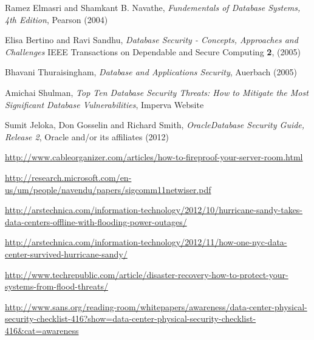 \documentclass[11pt, twocolumn]{article}
\begin{document}
\balance
\begin{thebibliography}{}

  Ramez Elmasri and Shamkant B. Navathe, {\it Fundementals of Database Systems, 4th Edition}, Pearson (2004)

  Elisa Bertino and Ravi Sandhu, {\it Database Security - Concepts, Approaches and Challenges} IEEE Transactions on Dependable and Secure Computing {\bf 2},  (2005)

  Bhavani Thuraisingham, {\it Database and Applications Security}, Auerbach (2005)

  Amichai Shulman, {\it Top Ten Database Security Threats: How to Mitigate the Most Significant Database Vulnerabilities}, Imperva Website

  Sumit Jeloka, Don Gosselin and Richard Smith, {\it Oracle\textregistered Database Security Guide, Release 2}, Oracle and/or its affiliates (2012)

  \url{http://www.cableorganizer.com/articles/how-to-fireproof-your-server-room.html}

  \url{http://research.microsoft.com/en-us/um/people/navendu/papers/sigcomm11netwiser.pdf}


  \url{http://arstechnica.com/information-technology/2012/10/hurricane-sandy-takes-data-centers-offline-with-flooding-power-outages/}

  \url{http://arstechnica.com/information-technology/2012/11/how-one-nyc-data-center-survived-hurricane-sandy/}

  \url{http://www.techrepublic.com/article/disaster-recovery-how-to-protect-your-systems-from-flood-threats/}

  \url{http://www.sans.org/reading-room/whitepapers/awareness/data-center-physical-security-checklist-416?show=data-center-physical-security-checklist-416\&cat=awareness}


\end{thebibliography}
\end{document}
